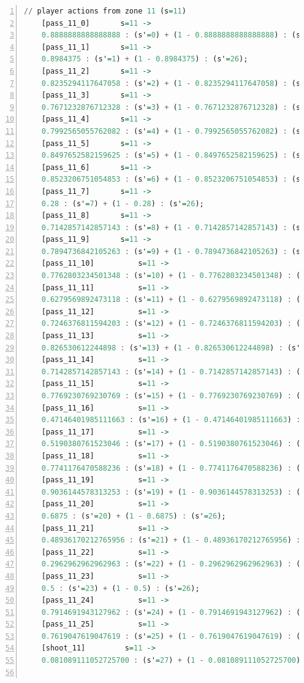 \documentclass{l4proj}
\begin{document}
\begin{appendices}
\begin{lstlisting}[language=Haskell, numbers=left, caption=MDP used for strategy generation. This is the model specification as-is after the refinements at the end of chapter 3.]
	// player actions from zone 11 (s=11)
	[pass_11_0]	      s=11 ->
	0.8888888888888888 : (s'=0) + (1 - 0.8888888888888888) : (s'=26);
	[pass_11_1]	      s=11 ->
	0.8984375 : (s'=1) + (1 - 0.8984375) : (s'=26);
	[pass_11_2]	      s=11 ->
	0.8235294117647058 : (s'=2) + (1 - 0.8235294117647058) : (s'=26);
	[pass_11_3]	      s=11 ->
	0.7671232876712328 : (s'=3) + (1 - 0.7671232876712328) : (s'=26);
	[pass_11_4]	      s=11 ->
	0.7992565055762082 : (s'=4) + (1 - 0.7992565055762082) : (s'=26);
	[pass_11_5]	      s=11 ->
	0.8497652582159625 : (s'=5) + (1 - 0.8497652582159625) : (s'=26);
	[pass_11_6]	      s=11 ->
	0.8523206751054853 : (s'=6) + (1 - 0.8523206751054853) : (s'=26);
	[pass_11_7]	      s=11 ->
	0.28 : (s'=7) + (1 - 0.28) : (s'=26);
	[pass_11_8]	      s=11 ->
	0.7142857142857143 : (s'=8) + (1 - 0.7142857142857143) : (s'=26);
	[pass_11_9]	      s=11 ->
	0.7894736842105263 : (s'=9) + (1 - 0.7894736842105263) : (s'=26);
	[pass_11_10]	      s=11 ->
	0.7762803234501348 : (s'=10) + (1 - 0.7762803234501348) : (s'=26);
	[pass_11_11]	      s=11 ->
	0.6279569892473118 : (s'=11) + (1 - 0.6279569892473118) : (s'=26);
	[pass_11_12]	      s=11 ->
	0.7246376811594203 : (s'=12) + (1 - 0.7246376811594203) : (s'=26);
	[pass_11_13]	      s=11 ->
	0.826530612244898 : (s'=13) + (1 - 0.826530612244898) : (s'=26);
	[pass_11_14]	      s=11 ->
	0.7142857142857143 : (s'=14) + (1 - 0.7142857142857143) : (s'=26);
	[pass_11_15]	      s=11 ->
	0.7769230769230769 : (s'=15) + (1 - 0.7769230769230769) : (s'=26);
	[pass_11_16]	      s=11 ->
	0.47146401985111663 : (s'=16) + (1 - 0.47146401985111663) : (s'=26);
	[pass_11_17]	      s=11 ->
	0.5190380761523046 : (s'=17) + (1 - 0.5190380761523046) : (s'=26);
	[pass_11_18]	      s=11 ->
	0.7741176470588236 : (s'=18) + (1 - 0.7741176470588236) : (s'=26);
	[pass_11_19]	      s=11 ->
	0.9036144578313253 : (s'=19) + (1 - 0.9036144578313253) : (s'=26);
	[pass_11_20]	      s=11 ->
	0.6875 : (s'=20) + (1 - 0.6875) : (s'=26);
	[pass_11_21]	      s=11 ->
	0.48936170212765956 : (s'=21) + (1 - 0.48936170212765956) : (s'=26);
	[pass_11_22]	      s=11 ->
	0.2962962962962963 : (s'=22) + (1 - 0.2962962962962963) : (s'=26);
	[pass_11_23]	      s=11 ->
	0.5 : (s'=23) + (1 - 0.5) : (s'=26);
	[pass_11_24]	      s=11 ->
	0.7914691943127962 : (s'=24) + (1 - 0.7914691943127962) : (s'=26);
	[pass_11_25]	      s=11 ->
	0.7619047619047619 : (s'=25) + (1 - 0.7619047619047619) : (s'=26);
	[shoot_11]	       s=11 ->
	0.081089111052725700 : (s'=27) + (1 - 0.081089111052725700) : (s'=26);


\end{lstlisting}
\end{appendices}
\end{document}
